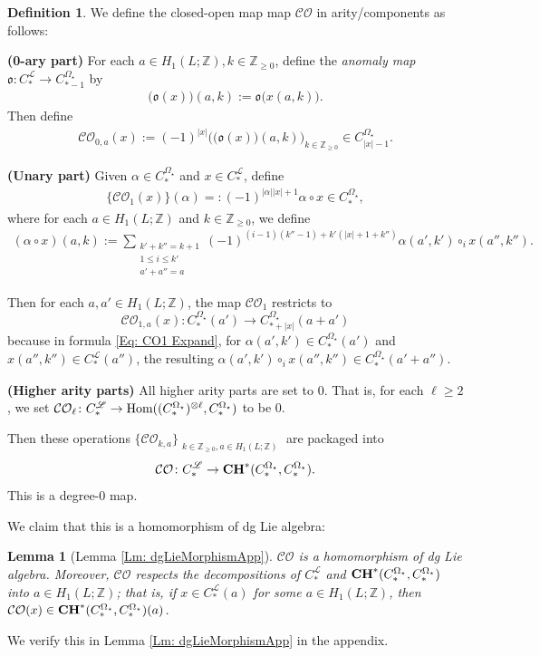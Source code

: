 \documentclass[10pt]{amsart}
\numberwithin{equation}{section}
\theoremstyle{plain}
\newtheorem{lemma}[theorem]{Lemma}
\theoremstyle{definition}
\newtheorem{definition}[theorem]{Definition}
\theoremstyle{remark}
\numberwithin{equation}{section}
\newcommand{\Z}{\mathbb{Z}}
\newcommand{\Hom}{\textup{Hom}}
\newcommand{\CO}{\mathcal{CO}}
\newcommand{\CC}{\textbf{\textup{CH}}}
\newcommand{\CFr}{C_*^\mathscr{L}}
\newcommand{\CBa}{C_*^{\Omega_\star}}
\newcommand{\Cba}[1]{C_{#1}^{\Omega_\star}}
\begin{document}
{\begin{definition}
We define the closed-open map map $\CO$ in arity/components as follows:

\textbf{(0-ary part)}
For each $a\in H_1(L;\Z), k\in \Z_{\geq 0}$, 
define the \emph{anomaly map} $\mathfrak{o}\colon \CFr\to \Cba{*-1}$ by
\begin{align}\label{Eq: AnomalyMapState}
	 \big(\mathfrak{o}(x)\big)(a,k):=  \mathfrak{o}\big(x(a,k)\big).
\end{align}
Then define
\begin{align}\label{Eq: CO0 OpenClosed}
\CO_{0,a}(x) := {(-1)^{|x|}}\bigg(\big(\mathfrak{o}(x)\big)(a,k)\bigg)_{k\in \Z_{\geq 0}} \in \Cba{|x|-1} .\end{align}





\textbf{(Unary part)}
Given $\alpha\in \CBa$ and $x\in \CFr$, define
\begin{align}\label{Eq: CO1 openclosed}\big\{\CO_{1}(x)\big\}(\alpha)=:{(-1)^{|\alpha||x|+1}}\alpha\circ x  \in \CBa,\end{align}
where for each $a\in H_1(L;\Z)$ and $k\in\Z_{\geq 0}$, we define
\begin{align}\label{Eq: CO1 Expand}(\alpha\circ x)(a, k):= \sum_{\substack{k'+k'' = k+1\\ 1\leq i \leq k'\\a'+ a'' = a}} {(-1)^{(i-1)(k''-1)+k'(|x|+1+k'')}} \alpha(a',k')\circ_i x(a'',k''). \end{align}


Then for each $a,a'\in H_1(L;\Z)$, the map $\CO_1$ restricts to
\[
	\CO_{1,a}(x)\colon \CBa(a')\to \Cba{*+|x|}(a+a')
\]
because in formula \eqref{Eq: CO1 Expand}, for $\alpha(a',k') \in \CBa(a')$ and $x(a'',k'')\in \CFr(a'')$, the resulting $\alpha(a',k')\circ_i x(a'',k'')\in \CBa(a'+a'')$.



\textbf{(Higher arity parts)} All higher arity parts are set to 0. That is, for each $\ell\geq 2$, we set $\CO_\ell\colon \CFr\to \Hom((\CBa)^{\otimes \ell}, \CBa)$ to be 0.

\bigskip
Then these operations $\{\CO_{k,a}\}_{\substack{k\in \Z_{\geq 0}, a\in H_1(L;\Z)}}$ are packaged into 
\[
	\CO \colon \CFr\to \CC^* (\CBa,\CBa).
\]
This is a degree-0 map.
\end{definition}

We claim that this is a homomorphism of dg Lie algebra:
\begin{lemma}[Lemma \ref{Lm: dgLieMorphismApp}]\label{Lm: dgLieMorphism}
	$\CO$ is a homomorphism of dg Lie algebra. Moreover, $\CO$ respects the decompositions of $\CFr$ and $\CC^*(\CBa,\CBa)$ into $a\in H_1(L;\Z)$; that is, if $x\in \CFr(a)$ for some $a\in H_1(L;\Z)$, then $\CO(x)\in \CC^*(\CBa,\CBa)(a)$.
\end{lemma}
We verify this in Lemma \ref{Lm: dgLieMorphismApp} in the appendix.



}
\end{document}
